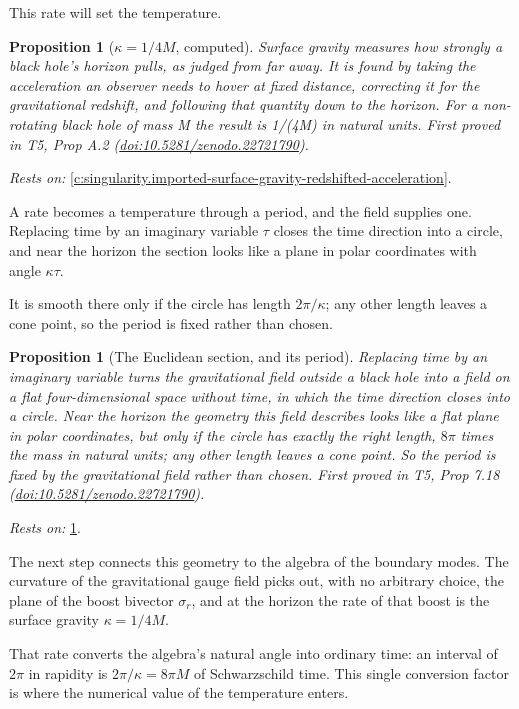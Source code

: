 \documentclass[11pt]{article}
\newtheorem{proposition}[theorem]{Proposition}
\theoremstyle{definition}
\theoremstyle{plain}
\begin{document}
This rate will set the temperature.

\begin{proposition}[$\kappa = 1/4M$, computed]\label{c:singularity.computed}
Surface gravity measures how strongly a black hole's horizon pulls, as judged from far away. It is found by taking the acceleration an observer needs to hover at fixed distance, correcting it for the gravitational redshift, and following that quantity down to the horizon. For a non-rotating black hole of mass M the result is 1/(4M) in natural units.
\emph{First proved in} T5, Prop A.2 (\href{https://doi.org/10.5281/zenodo.22721790}{doi:10.5281/zenodo.22721790}).
\end{proposition}
\noindent\emph{Rests on:} \ref{c:singularity.imported-surface-gravity-redshifted-acceleration}.

A rate becomes a temperature through a period, and the field supplies one. Replacing time by an imaginary variable $\tau$ closes the time direction into a circle, and near the horizon the section looks like a plane in polar coordinates with angle $\kappa\tau$.

It is smooth there only if the circle has length $2\pi/\kappa$; any other length leaves a cone point, so the period is fixed rather than chosen.

\begin{proposition}[The Euclidean section, and its period]\label{c:singularity.euclidean-section-period}
Replacing time by an imaginary variable turns the gravitational field outside a black hole into a field on a flat four-dimensional space without time, in which the time direction closes into a circle. Near the horizon the geometry this field describes looks like a flat plane in polar coordinates, but only if the circle has exactly the right length, $8\pi$ times the mass in natural units; any other length leaves a cone point. So the period is fixed by the gravitational field rather than chosen.
\emph{First proved in} T5, Prop 7.18 (\href{https://doi.org/10.5281/zenodo.22721790}{doi:10.5281/zenodo.22721790}).
\end{proposition}
\noindent\emph{Rests on:} \ref{c:singularity.computed}.

The next step connects this geometry to the algebra of the boundary modes. The curvature of the gravitational gauge field picks out, with no arbitrary choice, the plane of the boost bivector $\sigma_r$, and at the horizon the rate of that boost is the surface gravity $\kappa = 1/4M$.

That rate converts the algebra's natural angle into ordinary time: an interval of $2\pi$ in rapidity is $2\pi/\kappa = 8\pi M$ of Schwarzschild time. This single conversion factor is where the numerical value of the temperature enters.
\end{document}
